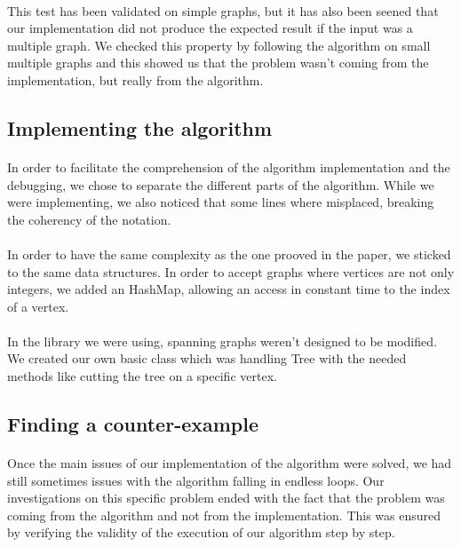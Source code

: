 \paragraph{}
This test has been validated on simple graphs, but it has also been seened that
our implementation did not produce the expected result if the input was a
multiple graph. We checked this property by following the algorithm on small
multiple graphs and this showed us that the problem wasn't coming from the
implementation, but really from the algorithm.

\subsection{Implementing the algorithm}
\paragraph{}
In order to facilitate the comprehension of the algorithm implementation and the
debugging, we chose to separate the different parts of the algorithm. While
we were implementing, we also noticed that some lines where misplaced, breaking
the coherency of the notation.

\paragraph{}
In order to have the same complexity as the one prooved in the paper, we sticked
to the same data structures. In order to accept graphs where vertices are not
only integers, we added an HashMap, allowing an access in constant time to the
index of a vertex.

\paragraph{}
In the library we were using, spanning graphs weren't designed to be modified. We
created our own basic class which was handling Tree with the needed methods like
cutting the tree on a specific vertex.

\subsection{Finding a counter-example}
\paragraph{}
Once the main issues of our implementation of the algorithm were solved, we
had still sometimes issues with the algorithm falling in endless loops. Our
investigations on this specific problem ended with the fact that the problem was
coming from the algorithm and not from the implementation. This was ensured by
verifying the validity of the execution of our algorithm step by step.

